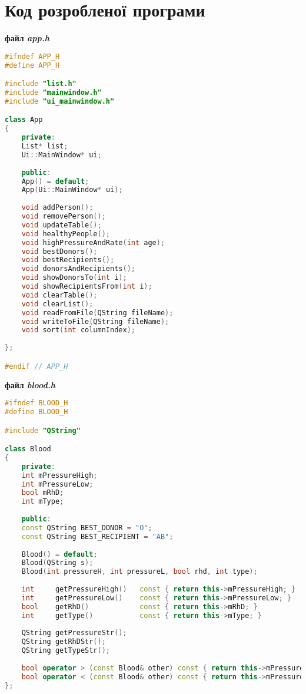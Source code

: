 \documentclass[oneside,14pt]{extarticle}
\begin{document}
\section{Код розробленої програми}
\begin{small}
	

\textbf{файл \textit{app.h}}
\begin{lstlisting}[language=c++]
#ifndef APP_H
#define APP_H

#include "list.h"
#include "mainwindow.h"
#include "ui_mainwindow.h"

class App
{
	private:
	List* list;
	Ui::MainWindow* ui;
	
	public:
	App() = default;
	App(Ui::MainWindow* ui);
	
	void addPerson();
	void removePerson();
	void updateTable();
	void healthyPeople();
	void highPressureAndRate(int age);
	void bestDonors();
	void bestRecipients();
	void donorsAndRecipients();
	void showDonorsTo(int i);
	void showRecipientsFrom(int i);
	void clearTable();
	void clearList();
	void readFromFile(QString fileName);
	void writeToFile(QString fileName);
	void sort(int columnIndex);
	
};

#endif // APP_H
\end{lstlisting}

\textbf{файл \textit{blood.h}}
\begin{lstlisting}[language=c++]
#ifndef BLOOD_H
#define BLOOD_H

#include "QString"

class Blood
{
	private:
	int mPressureHigh;
	int mPressureLow;
	bool mRhD;
	int mType;
	
	public:
	const QString BEST_DONOR = "O";
	const QString BEST_RECIPIENT = "AB";
	
	Blood() = default;
	Blood(QString s);
	Blood(int pressureH, int pressureL, bool rhd, int type);
	
	int     getPressureHigh()   const { return this->mPressureHigh; }
	int     getPressureLow()    const { return this->mPressureLow; }
	bool    getRhD()            const { return this->mRhD; }
	int     getType()           const { return this->mType; }
	
	QString getPressureStr();
	QString getRhDStr();
	QString getTypeStr();
	
	bool operator > (const Blood& other) const { return this->mPressureLow + this->mPressureHigh > other.mPressureHigh + other.mPressureLow; }
	bool operator < (const Blood& other) const { return this->mPressureLow + this->mPressureHigh < other.mPressureHigh + other.mPressureLow; }
};


\end{lstlisting}
\end{small}
\end{document}
